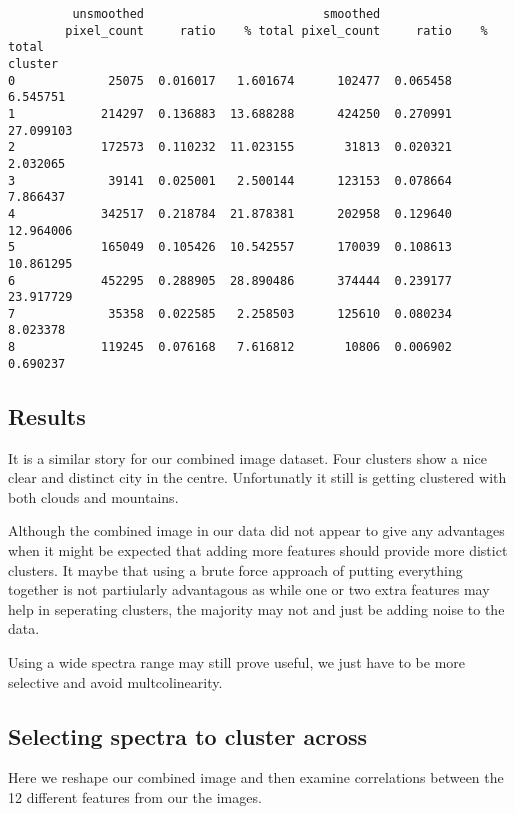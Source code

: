 \documentclass[11pt]{article}
\begin{document}
    
    \begin{verbatim}
         unsmoothed                         smoothed                     
        pixel_count     ratio    % total pixel_count     ratio    % total
cluster                                                                  
0             25075  0.016017   1.601674      102477  0.065458   6.545751
1            214297  0.136883  13.688288      424250  0.270991  27.099103
2            172573  0.110232  11.023155       31813  0.020321   2.032065
3             39141  0.025001   2.500144      123153  0.078664   7.866437
4            342517  0.218784  21.878381      202958  0.129640  12.964006
5            165049  0.105426  10.542557      170039  0.108613  10.861295
6            452295  0.288905  28.890486      374444  0.239177  23.917729
7             35358  0.022585   2.258503      125610  0.080234   8.023378
8            119245  0.076168   7.616812       10806  0.006902   0.690237
    \end{verbatim}

    
    \subsection{Results}\label{results}

It is a similar story for our combined image dataset. Four clusters show
a nice clear and distinct city in the centre. Unfortunatly it still is
getting clustered with both clouds and mountains.

Although the combined image in our data did not appear to give any
advantages when it might be expected that adding more features should
provide more distict clusters. It maybe that using a brute force
approach of putting everything together is not partiularly advantagous
as while one or two extra features may help in seperating clusters, the
majority may not and just be adding noise to the data.

Using a wide spectra range may still prove useful, we just have to be
more selective and avoid multcolinearity.

    \subsection{Selecting spectra to cluster
across}\label{selecting-spectra-to-cluster-across}

Here we reshape our combined image and then examine correlations between
the 12 different features from our the images.
\end{document}
